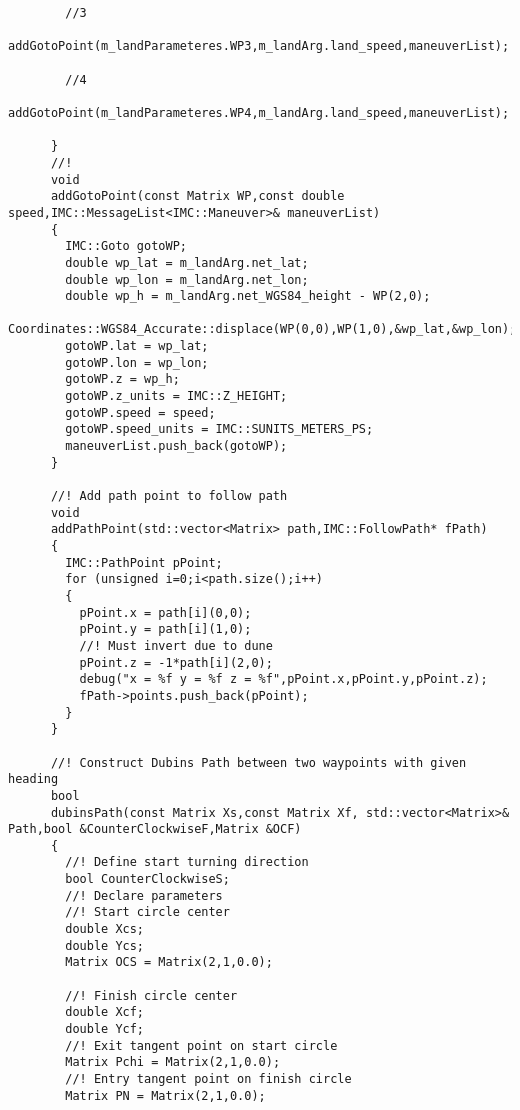 \begin{frame}[fragile]
\begin{lstlisting}
        //3
        addGotoPoint(m_landParameteres.WP3,m_landArg.land_speed,maneuverList);

        //4
        addGotoPoint(m_landParameteres.WP4,m_landArg.land_speed,maneuverList);

      }
      //!
      void
      addGotoPoint(const Matrix WP,const double speed,IMC::MessageList<IMC::Maneuver>& maneuverList)
      {
        IMC::Goto gotoWP;
        double wp_lat = m_landArg.net_lat;
        double wp_lon = m_landArg.net_lon;
        double wp_h = m_landArg.net_WGS84_height - WP(2,0);
        Coordinates::WGS84_Accurate::displace(WP(0,0),WP(1,0),&wp_lat,&wp_lon);
        gotoWP.lat = wp_lat;
        gotoWP.lon = wp_lon;
        gotoWP.z = wp_h;
        gotoWP.z_units = IMC::Z_HEIGHT;
        gotoWP.speed = speed;
        gotoWP.speed_units = IMC::SUNITS_METERS_PS;
        maneuverList.push_back(gotoWP);
      }

      //! Add path point to follow path
      void
      addPathPoint(std::vector<Matrix> path,IMC::FollowPath* fPath)
      {
        IMC::PathPoint pPoint;
        for (unsigned i=0;i<path.size();i++)
        {
          pPoint.x = path[i](0,0);
          pPoint.y = path[i](1,0);
          //! Must invert due to dune
          pPoint.z = -1*path[i](2,0);
          debug("x = %f y = %f z = %f",pPoint.x,pPoint.y,pPoint.z);
          fPath->points.push_back(pPoint);
        }
      }

      //! Construct Dubins Path between two waypoints with given heading
      bool
      dubinsPath(const Matrix Xs,const Matrix Xf, std::vector<Matrix>& Path,bool &CounterClockwiseF,Matrix &OCF)
      {
        //! Define start turning direction
        bool CounterClockwiseS;
        //! Declare parameters
        //! Start circle center
        double Xcs;
        double Ycs;
        Matrix OCS = Matrix(2,1,0.0);

        //! Finish circle center
        double Xcf;
        double Ycf;
        //! Exit tangent point on start circle
        Matrix Pchi = Matrix(2,1,0.0);
        //! Entry tangent point on finish circle
        Matrix PN = Matrix(2,1,0.0);


\end{lstlisting}
\end{frame}

